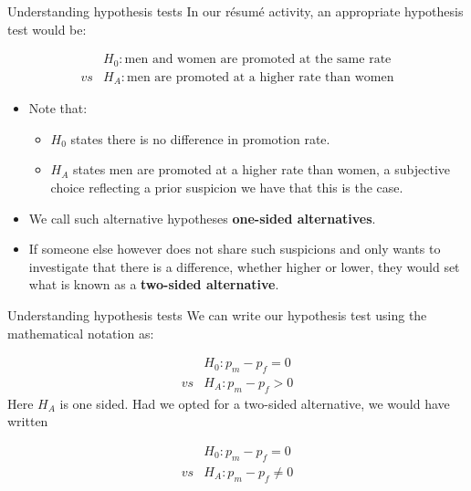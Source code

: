 \documentclass[
  ignorenonframetext,
]{beamer}
\providecommand{\tightlist}{%
  \setlength{\itemsep}{0pt}\setlength{\parskip}{0pt}}
\begin{document}
\begin{frame}{Understanding hypothesis tests}
\label{understanding-hypothesis-tests-3}
In our résumé activity, an appropriate hypothesis test would be:

\[\begin{array}{ll}
&H_0: \text{men and women are promoted at the same rate}\\
vs&H_A: \text{men are promoted at a higher rate than women}
\end{array}\]

\begin{itemize}
\item
  Note that:

  \begin{itemize}
  \tightlist
  \item
    \(H_0\) states there is no difference in promotion rate.
  \item
    \(H_A\) states men are promoted at a higher rate than women, a
    subjective choice reflecting a prior suspicion we have that this is
    the case.
  \end{itemize}
\item
  We call such alternative hypotheses \textbf{one-sided alternatives}.
\item
  If someone else however does not share such suspicions and only wants
  to investigate that there is a difference, whether higher or lower,
  they would set what is known as a \textbf{two-sided alternative}.
\end{itemize}
\end{frame}

\begin{frame}{Understanding hypothesis tests}
\label{understanding-hypothesis-tests-4}
We can write our hypothesis test using the mathematical notation as:

\[\begin{array}{ll}
&H_0: p_m-p_f=0\\
vs&H_A: p_m-p_f>0
\end{array}\] Here \(H_A\) is one sided. Had we opted for a two-sided
alternative, we would have written

\[\begin{array}{ll}
&H_0: p_m-p_f=0\\
vs&H_A: p_m-p_f\neq 0
\end{array}\]
\end{frame}
\end{document}
